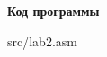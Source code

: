 \begin{center}
	{\bf\normalsize Код программы}
\end{center}

\begin{lstinputlisting}[style={asm},linerange={1-574}]{src/lab2.asm}
\end{lstinputlisting}